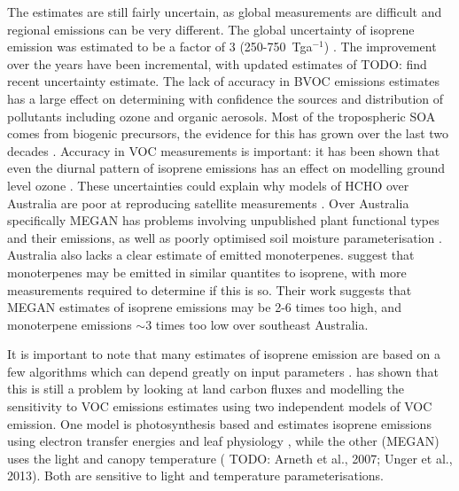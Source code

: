     The estimates are still fairly uncertain, as global measurements are difficult and regional emissions can be very different. 
    The global uncertainty of isoprene emission was estimated to be a factor of 3 (250-750~Tga$^{-1}$) \citep{Kanakidou2005}.
    The improvement over the years have been incremental, with updated estimates of TODO: find recent uncertainty estimate.
    The lack of accuracy in BVOC emissions estimates has a large effect on determining with confidence the sources and distribution of pollutants including ozone and organic aerosols.
    Most of the tropospheric SOA comes from biogenic precursors, the evidence for this has grown over the last two decades \citep{Guenther1995, Kanakidou2005,Guenther2012}.
    Accuracy in VOC measurements is important: it has been shown that even the diurnal pattern of isoprene emissions has an effect on modelling ground level ozone \citep{Hewitt2011,Fan2004}.
    These uncertainties could explain why models of HCHO over Australia are poor at reproducing satellite measurements \citep{Stavrakou2009}.
    Over Australia specifically MEGAN has problems involving unpublished plant functional types and their emissions, as well as poorly optimised soil moisture parameterisation \citep{Emmerson2016}.
    Australia also lacks a clear estimate of emitted monoterpenes.
    \cite{Emmerson2016} suggest that monoterpenes may be emitted in similar quantites to isoprene, with more measurements required to determine if this is so.
    Their work suggests that MEGAN estimates of isoprene emissions may be 2-6 times too high, and monoterpene emissions $\sim3$ times too low over southeast Australia.
    
    It is important to note that many estimates of isoprene emission are based on a few algorithms which can depend greatly on input parameters \citep{Niinemets2010}.
    \citet{Yue2015} has shown that this is still a problem by looking at land carbon fluxes and modelling the sensitivity to VOC emissions estimates using two independent models of VOC emission.
    One model is photosynthesis based and estimates isoprene emissions using electron transfer energies and leaf physiology \citep{Niinemets1999}, while the other (MEGAN) uses the light and canopy temperature (\citep{Guenther1995} TODO: Arneth et al., 2007; Unger et al., 2013).
    Both are sensitive to light and temperature parameterisations.
    
